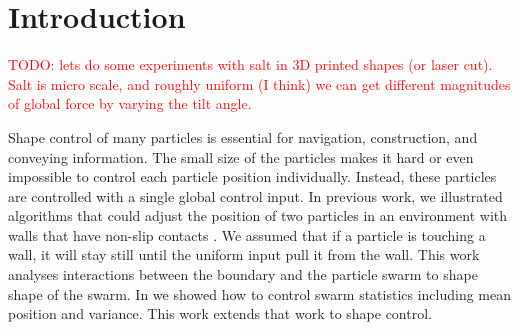 \section{Introduction}\label{sec:Intro}

   \textcolor{red}{TODO: lets do some experiments with salt in 3D printed shapes (or laser cut). Salt is micro scale, and roughly uniform (I think) we can get different magnitudes of global force by varying the tilt angle.}
   



Shape control of many particles is essential for navigation, construction, and conveying information. 
 The small size of the particles makes it hard or even impossible to control each particle position individually. Instead, these particles are controlled with a single global control input.
 In previous work, we illustrated algorithms that could adjust the position of two particles in an environment with walls that have non-slip contacts \cite{shahrokhi2017}. We assumed that if a particle is touching a wall, it will stay still until the uniform input pull it from the wall. This work analyses interactions between the boundary and the particle swarm to shape shape of the swarm. In \cite{shahrokhi2018TRO} we showed how to control swarm statistics including mean position and variance. This work extends that work to shape control.



